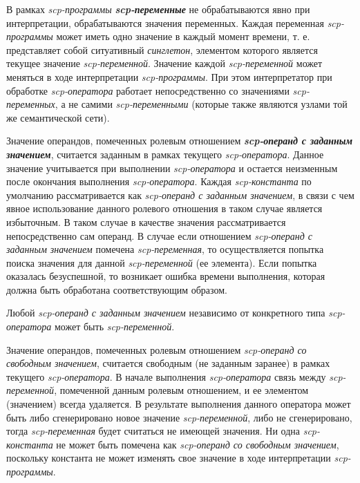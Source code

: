 В рамках \textit{scp-программы} \textbf{\textit{scp-переменные\scnrolesign}} не обрабатываются явно при интерпретации, обрабатываются значения переменных. Каждая переменная \textit{scp-программы} может иметь одно значение в каждый момент времени, т. е. представляет собой ситуативный \textit{синглетон}, элементом которого является текущее значение \textit{scp-переменной\scnrolesign}. Значение каждой \textit{scp-переменной\scnrolesign} может меняться в ходе интерпретации \textit{scp-программы}. При этом интерпретатор при обработке \textit{scp-оператора} работает непосредственно со значениями \textit{\mbox{scp-переменных\scnrolesign}}, а не самими \textit{scp-переменными\scnrolesign} (которые также являются узлами той же семантической сети).

Значение операндов, помеченных ролевым отношением \textbf{\textit{scp-операнд с заданным значением\scnrolesign}}, считается заданным в рамках текущего \textit{scp-оператора}. Данное значение учитывается при выполнении \textit{scp-оператора} и остается неизменным после окончания выполнения \textit{scp-оператора}. Каждая \textit{scp-константа\scnrolesign} по умолчанию рассматривается как \textit{scp-операнд с заданным значением\scnrolesign}, в связи с чем явное использование данного ролевого отношения в таком случае является избыточным. В таком случае в качестве значения рассматривается непосредственно сам операнд. В случае если отношением \textit{\mbox{scp-операнд} с заданным значением\scnrolesign} помечена \textit{scp-переменная\scnrolesign}, то осуществляется попытка поиска значения для данной \textit{scp-переменной\scnrolesign} (ее элемента). Если попытка оказалась безуспешной, то возникает ошибка времени выполнения, которая должна быть обработана соответствующим образом.
	
Любой \textit{scp-операнд с заданным значением\scnrolesign} независимо от конкретного типа \textit{scp-оператора} может быть \textit{scp-переменной\scnrolesign}.

Значение операндов, помеченных ролевым отношением \textit{scp-операнд со свободным значением\scnrolesign}, считается свободным (не заданным заранее) в рамках текущего \textit{scp-оператора}. В начале выполнения \textit{scp-оператора} связь между \textit{scp-переменной\scnrolesign}, помеченной данным ролевым отношением, и ее элементом (значением) всегда удаляется. В результате выполнения данного оператора может быть либо сгенерировано новое значение \textit{scp-переменной\scnrolesign}, либо не сгенерировано, тогда \textit{scp-переменная\scnrolesign} будет считаться не имеющей значения. Ни одна \textit{scp-константа\scnrolesign} не может быть помечена как \textit{scp-операнд со свободным значением\scnrolesign}, поскольку константа не может изменять свое значение в ходе интерпретации \textit{scp-программы}.

